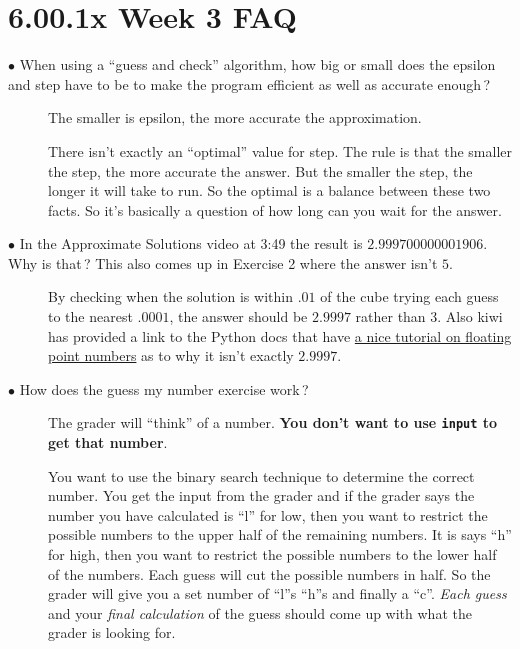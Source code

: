 \documentclass{article}
\newcommand{\inlinecode}[1]{\texttt{#1}}
\newcommand{\link}[2]{\textcolor{blue}{\href{#2}{#1}}}
\newcommand{\question}[1]{\item[$\bullet$ #1] \hfil}
\newenvironment{answer}{\newline}{}
\newenvironment{faq}{\begin{description}}{\end{description}}
\begin{document}
	
	\section*{\Huge6.00.1x Week 3 FAQ}
	
	\begin{faq}
		\question{When using a ``guess and check'' algorithm, how big or small does the epsilon and step have to be to make the program efficient as well as accurate enough\,?}
		\begin{answer}
			The smaller is epsilon, the more accurate the approximation.  
			
			There isn't exactly an ``optimal'' value for step.  The rule is that the smaller the step, the more accurate the answer. But the smaller the step, the longer it will take to run.  So the optimal is a balance between these two facts.  So it's basically a question of how long can you wait for the answer.
		\end{answer}
		
		\question{In the Approximate Solutions video at 3:49 the result is $2.999700000001906$.  Why is that\,?  This also comes up in Exercise 2 where the answer isn't $5$.}
		\begin{answer}
			By checking when the solution is within $.01$ of the cube trying each guess to the nearest $.0001$, the answer should be $2.9997$ rather than $3$.  Also kiwi has provided a link to the Python docs that have \link{a nice tutorial on floating point numbers}{https://docs.python.org/3/tutorial/floatingpoint.html} as to why it isn't exactly $2.9997$.
		\end{answer}
		
		\question{How does the guess my number exercise work\,?}
		\begin{answer}
			The grader will ``think'' of a number. \textbf{You don't want to use \inlinecode{input} to get that number}.
			
			You want to use the binary search technique to determine the correct number. You get the input from the grader and if the grader says the number you have calculated is ``l'' for low, then you want to restrict the possible numbers to the upper half of the remaining numbers. It is says ``h'' for high, then you want to restrict the possible numbers to the lower half of the numbers. Each guess will cut the possible numbers in half. So the grader will give you a set number of ``l''s ``h''s and finally a ``c''. \textit{Each guess} and your \textit{final calculation} of the guess should come up with what the grader is looking for.
		\end{answer}
		

\end{faq}
\end{document}

